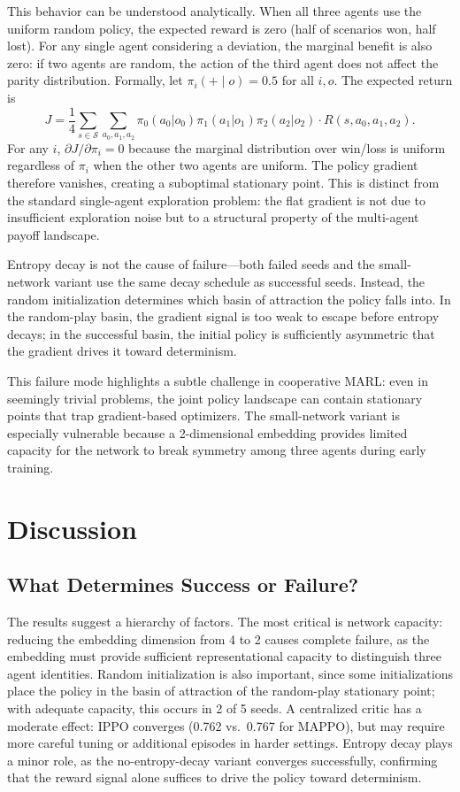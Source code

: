 \documentclass[journal]{IEEEtran}
\begin{document}
This behavior can be understood analytically. When all three agents use the uniform random policy, the expected reward is zero (half of scenarios won, half lost). For any single agent considering a deviation, the marginal benefit is also zero: if two agents are random, the action of the third agent does not affect the parity distribution. Formally, let $\pi_i(+ \mid o) = 0.5$ for all $i, o$. The expected return is
\begin{equation}
    J = \frac{1}{4}\sum_{s \in \mathcal{S}} \sum_{a_0,a_1,a_2} \pi_0(a_0|o_0)\pi_1(a_1|o_1)\pi_2(a_2|o_2) \cdot R(s, a_0, a_1, a_2).
\end{equation}
For any $i$, $\partial J / \partial \pi_i = 0$ because the marginal distribution over win/loss is uniform regardless of $\pi_i$ when the other two agents are uniform. The policy gradient therefore vanishes, creating a suboptimal stationary point. This is distinct from the standard single-agent exploration problem: the flat gradient is not due to insufficient exploration noise but to a structural property of the multi-agent payoff landscape.

Entropy decay is not the cause of failure---both failed seeds and the small-network variant use the same decay schedule as successful seeds. Instead, the random initialization determines which basin of attraction the policy falls into. In the random-play basin, the gradient signal is too weak to escape before entropy decays; in the successful basin, the initial policy is sufficiently asymmetric that the gradient drives it toward determinism.

This failure mode highlights a subtle challenge in cooperative MARL: even in seemingly trivial problems, the joint policy landscape can contain stationary points that trap gradient-based optimizers. The small-network variant is especially vulnerable because a 2-dimensional embedding provides limited capacity for the network to break symmetry among three agents during early training.

\section{Discussion}

\subsection{What Determines Success or Failure?}

The results suggest a hierarchy of factors. The most critical is network capacity: reducing the embedding dimension from 4 to 2 causes complete failure, as the embedding must provide sufficient representational capacity to distinguish three agent identities. Random initialization is also important, since some initializations place the policy in the basin of attraction of the random-play stationary point; with adequate capacity, this occurs in 2 of 5 seeds. A centralized critic has a moderate effect: IPPO converges (0.762 vs.\ 0.767 for MAPPO), but may require more careful tuning or additional episodes in harder settings. Entropy decay plays a minor role, as the no-entropy-decay variant converges successfully, confirming that the reward signal alone suffices to drive the policy toward determinism.
\end{document}
